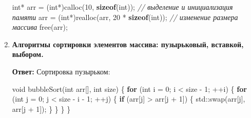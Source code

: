 \documentclass[
]{article}
\newenvironment{Shaded}{}{}
\newcommand{\BuiltInTok}[1]{\textcolor[rgb]{0.00,0.50,0.00}{#1}}
\newcommand{\CommentTok}[1]{\textcolor[rgb]{0.38,0.63,0.69}{\textit{#1}}}
\newcommand{\ControlFlowTok}[1]{\textcolor[rgb]{0.00,0.44,0.13}{\textbf{#1}}}
\newcommand{\DataTypeTok}[1]{\textcolor[rgb]{0.56,0.13,0.00}{#1}}
\newcommand{\DecValTok}[1]{\textcolor[rgb]{0.25,0.63,0.44}{#1}}
\newcommand{\KeywordTok}[1]{\textcolor[rgb]{0.00,0.44,0.13}{\textbf{#1}}}
\newcommand{\NormalTok}[1]{#1}
\newcommand{\OperatorTok}[1]{\textcolor[rgb]{0.40,0.40,0.40}{#1}}
\begin{document}
\begin{enumerate}
\begin{Shaded}
\begin{Highlighting}[]
\DataTypeTok{int}\OperatorTok{*}\NormalTok{ arr }\OperatorTok{=} \OperatorTok{(}\DataTypeTok{int}\OperatorTok{*)}\NormalTok{calloc}\OperatorTok{(}\DecValTok{10}\OperatorTok{,} \KeywordTok{sizeof}\OperatorTok{(}\DataTypeTok{int}\OperatorTok{));} \CommentTok{// выделение и инициализация памяти}
\NormalTok{arr }\OperatorTok{=} \OperatorTok{(}\DataTypeTok{int}\OperatorTok{*)}\NormalTok{realloc}\OperatorTok{(}\NormalTok{arr}\OperatorTok{,} \DecValTok{20} \OperatorTok{*} \KeywordTok{sizeof}\OperatorTok{(}\DataTypeTok{int}\OperatorTok{));} \CommentTok{// изменение размера массива}
\NormalTok{free}\OperatorTok{(}\NormalTok{arr}\OperatorTok{);}
\end{Highlighting}
\end{Shaded}
\item
  \textbf{Алгоритмы сортировки элементов массива: пузырьковый, вставкой,
  выбором.}

  \textbf{Ответ:} Сортировка пузырьком:

\begin{Shaded}
\begin{Highlighting}[]


\DataTypeTok{void}\NormalTok{ bubbleSort}\OperatorTok{(}\DataTypeTok{int}\NormalTok{ arr}\OperatorTok{[],} \DataTypeTok{int}\NormalTok{ size}\OperatorTok{)} \OperatorTok{\{}
    \ControlFlowTok{for} \OperatorTok{(}\DataTypeTok{int}\NormalTok{ i }\OperatorTok{=} \DecValTok{0}\OperatorTok{;}\NormalTok{ i }\OperatorTok{\textless{}}\NormalTok{ size }\OperatorTok{{-}} \DecValTok{1}\OperatorTok{;} \OperatorTok{++}\NormalTok{i}\OperatorTok{)} \OperatorTok{\{}
        \ControlFlowTok{for} \OperatorTok{(}\DataTypeTok{int}\NormalTok{ j }\OperatorTok{=} \DecValTok{0}\OperatorTok{;}\NormalTok{ j }\OperatorTok{\textless{}}\NormalTok{ size }\OperatorTok{{-}}\NormalTok{ i }\OperatorTok{{-}} \DecValTok{1}\OperatorTok{;} \OperatorTok{++}\NormalTok{j}\OperatorTok{)} \OperatorTok{\{}
            \ControlFlowTok{if} \OperatorTok{(}\NormalTok{arr}\OperatorTok{[}\NormalTok{j}\OperatorTok{]} \OperatorTok{\textgreater{}}\NormalTok{ arr}\OperatorTok{[}\NormalTok{j }\OperatorTok{+} \DecValTok{1}\OperatorTok{])} \OperatorTok{\{}
                \BuiltInTok{std::}\NormalTok{swap}\OperatorTok{(}\NormalTok{arr}\OperatorTok{[}\NormalTok{j}\OperatorTok{],}\NormalTok{ arr}\OperatorTok{[}\NormalTok{j }\OperatorTok{+} \DecValTok{1}\OperatorTok{]);}
            \OperatorTok{\}}
        \OperatorTok{\}}
    \OperatorTok{\}}
\OperatorTok{\}}
\end{Highlighting}
\end{Shaded}


\end{enumerate}
\end{document}
